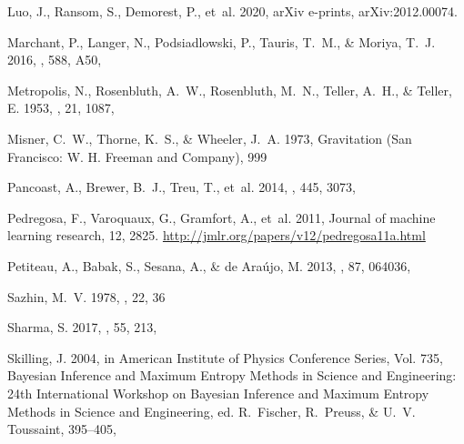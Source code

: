 \documentclass[times,tight]{aastex631}
\begin{document}
\begin{thebibliography}{}
{Luo}, J., {Ransom}, S., {Demorest}, P., {et~al.} 2020, arXiv e-prints,
  arXiv:2012.00074.
\newblock {}

{Marchant}, P., {Langer}, N., {Podsiadlowski}, P., {Tauris}, T.~M., \&
  {Moriya}, T.~J. 2016, \aap, 588, A50, 

{Metropolis}, N., {Rosenbluth}, A.~W., {Rosenbluth}, M.~N., {Teller}, A.~H., \&
  {Teller}, E. 1953, \jcp, 21, 1087, 

{Misner}, C.~W., {Thorne}, K.~S., \& {Wheeler}, J.~A. 1973, {Gravitation} (San
  Francisco: W. H. Freeman and Company), 999

{Pancoast}, A., {Brewer}, B.~J., {Treu}, T., {et~al.} 2014, \mnras, 445, 3073,

Pedregosa, F., Varoquaux, G., Gramfort, A., {et~al.} 2011, Journal of machine
  learning research, 12, 2825.
\newblock \url{http://jmlr.org/papers/v12/pedregosa11a.html}

{Petiteau}, A., {Babak}, S., {Sesana}, A., \& {de Ara{\'u}jo}, M. 2013, \prd,
  87, 064036, 

{Sazhin}, M.~V. 1978, \sovast, 22, 36

{Sharma}, S. 2017, \araa, 55, 213, 

{Skilling}, J. 2004, in American Institute of Physics Conference Series, Vol.
  735, Bayesian Inference and Maximum Entropy Methods in Science and
  Engineering: 24th International Workshop on Bayesian Inference and Maximum
  Entropy Methods in Science and Engineering, ed. R.~{Fischer}, R.~{Preuss}, \&
  U.~V. {Toussaint}, 395--405, 


\end{thebibliography}
\end{document}
